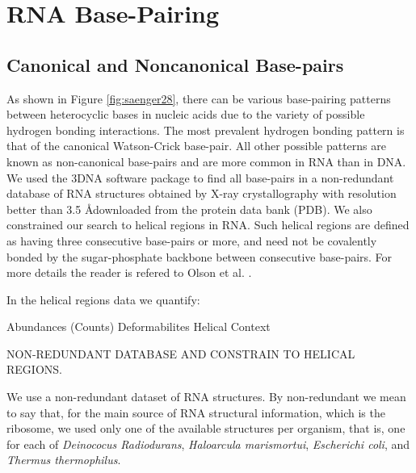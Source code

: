 \chapter{RNA Base-Pairing}
\label{basepairs} 

\section{Canonical and Noncanonical Base-pairs} 
As  shown   in  Figure  \ref{fig:saenger28},  there   can  be  various
base-pairing patterns between heterocyclic  bases in nucleic acids due
to the  variety of possible  hydrogen bonding interactions.   The most
prevalent  hydrogen   bonding  pattern   is  that  of   the  canonical
Watson-Crick  base-pair.  All  other  possible patterns  are known  as
non-canonical base-pairs and  are more common in RNA  than in DNA.  We
used the 3DNA \cite{lu2003} software package to find all base-pairs in
a  non-redundant   database  of  RNA  structures   obtained  by  X-ray
crystallography with  resolution better  than 3.5 \AA  downloaded from
the  protein data  bank  (PDB).   We also  constrained  our search  to
helical regions  in RNA.  Such  helical regions are defined  as having
three  consecutive base-pairs  or  more, and  need  not be  covalently
bonded by the sugar-phosphate backbone between consecutive base-pairs.
For   more    details   the   reader   is   refered    to   Olson   et
al. \cite{olson2009}.






In the helical regions data we quantify:

Abundances (Counts)
Deformabilites
Helical Context

NON-REDUNDANT DATABASE AND CONSTRAIN TO HELICAL REGIONS.

We use a non-redundant dataset of RNA structures.  By non-redundant we
mean to say  that, for the main source  of RNA structural information,
which is  the ribosome, we used  only one of  the available structures
per   organism,  that   is,   one  for   each  of   \textit{Deinococus
  Radiodurans},  \textit{Haloarcula  marismortui},  \textit{Escherichi
  coli},  and  \textit{Thermus thermophilus}.

